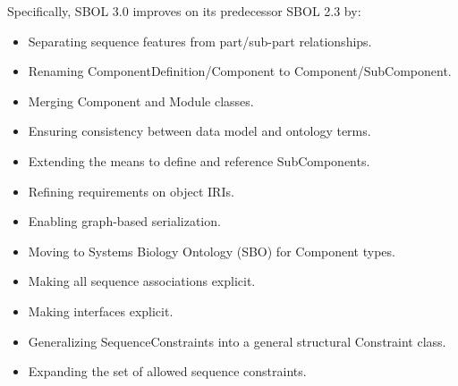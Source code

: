 Specifically, SBOL 3.0 improves on its predecessor SBOL 2.3 by:
\begin{itemize}
\item Separating sequence features from part/sub-part relationships.
\item Renaming ComponentDefinition/Component to Component/SubComponent.
\item Merging Component and Module classes.
\item Ensuring consistency between data model and ontology terms.
\item Extending the means to define and reference SubComponents.
\item Refining requirements on object IRIs.
\item Enabling graph-based serialization.
\item Moving to Systems Biology Ontology (SBO) for Component types.
\item Making all sequence associations explicit.
\item Making interfaces explicit.
\item Generalizing SequenceConstraints into a general structural Constraint class.
\item Expanding the set of allowed sequence constraints.
\end{itemize}
